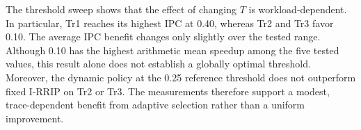 The threshold sweep shows that the effect of changing $T$ is workload-dependent. In particular, Tr1 reaches its highest IPC at 0.40, whereas Tr2 and Tr3 favor 0.10. The average IPC benefit changes only slightly over the tested range. Although 0.10 has the highest arithmetic mean speedup among the five tested values, this result alone does not establish a globally optimal threshold. Moreover, the dynamic policy at the 0.25 reference threshold does not outperform fixed I-RRIP on Tr2 or Tr3. The measurements therefore support a modest, trace-dependent benefit from adaptive selection rather than a uniform improvement.
